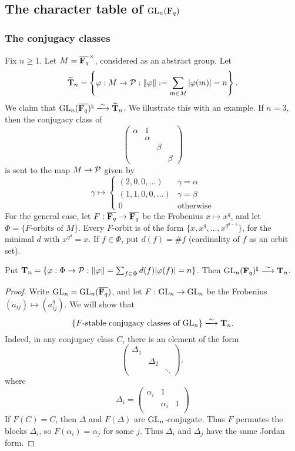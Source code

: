 \subsection{The character table of \texorpdfstring{$\operatorname{GL}_n(\mathbf{F}_q)$}{GLnFq}}


\subsubsection{The conjugacy classes}

Fix $n\geqslant 1$. Let $M=\overline{\mathbf{F}_q}^\times$, considered as an abstract 
group. Let 
\[
  \widetilde{\mathbf{T}}_n = \left\{\varphi:M\to \mathcal{P}:\|\varphi\| := \sum_{m\in M} |\varphi(m)| = n\right\} . 
\]
We claim that $\generallinear_n(\overline{\dF_q})^\natural \isomorphism \widetilde\dT_n$. 
We illustrate this with an example. If $n=3$, then the conjugacy class of 
\[
  \begin{pmatrix} \alpha & 1 \\ & \alpha \\ & & \beta \\ & & & \beta \end{pmatrix}
\]
is sent to the map $M\to \mathcal{P}$ given by 
\[
  \gamma\mapsto 
  \begin{cases}
    (2,0,0,\dots) & \gamma = \alpha \\ 
    (1,1,0,0,\dots) & \gamma = \beta \\
    0 & \text{otherwise} 
  \end{cases}
\]
For the general case, let $F:\overline{\mathbf{F}_q} \to \overline{\mathbf{F}_q}$ be the Frobenius 
$x\mapsto x^q$, and let $\Phi=\{\text{$F$-orbits of $M$}\}$. Every $F$-orbit is 
of the form $\{x,x^q,\dots,x^{q^{d-1}}\}$, for the minimal $d$ with 
$x^{q^d} = x$. If $f\in \Phi$, put 
$d(f) = \# f$ (cardinality of $f$ as an orbit set). 

\begin{prop}
Put $\mathbf{T}_n = \{\varphi:\Phi\to \mathcal{P}:\|\varphi\| = \sum_{f\in \Phi} d(f)|\varphi(f)| = n\}$. 
Then $\generallinear_n(\dF_q)^\natural \isomorphism \dT_n$. 
\end{prop}
\begin{proof}
Write $\operatorname{GL}_n = \operatorname{GL}_n(\overline{\mathbf{F}_q})$, and 
let $F:\operatorname{GL}_n\to \operatorname{GL}_n$ be the Frobenius 
$(a_{i j})\mapsto (a_{i j}^q)$. We will show that 
\[
  \{\text{$F$-stable conjugacy classes of $\generallinear_n$}\}\isomorphism \dT_n .
\]
Indeed, in any conjugacy class $C$, there is an element of the form 
\[
  \begin{pmatrix} \Delta_1 \\ & \Delta_2 \\ & & \ddots \end{pmatrix} ,
\]
where 
\[
  \Delta_i = \begin{pmatrix} \alpha_i & 1 \\ & \alpha_i & 1 \\ \end{pmatrix}
\]
If $F(C)=C$, then $\Delta$ and $F(\Delta)$ are $\operatorname{GL}_n$-conjugate. Thus 
$F$ permutes the blocks $\Delta_i$, so $F(\alpha_i) = \alpha_j$ for some $j$. Thus 
$\Delta_i$ and $\Delta_j$ have the same Jordan form. 
\end{proof}

